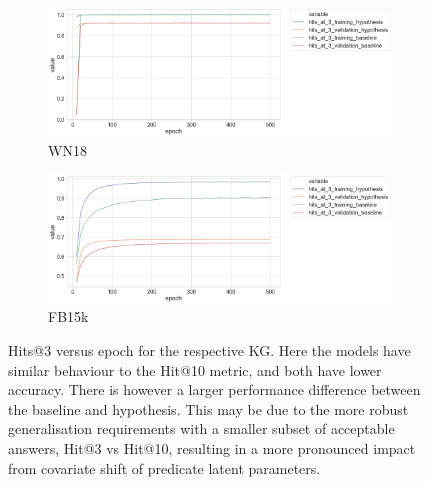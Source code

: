 
\begin{figure}[H]
	\begin{subfigure}[b]{.5\linewidth}
   		\centering
    		\includegraphics[width=1.0\linewidth, height=0.6\linewidth]{WN18_hits_at_3_Results}
		\captionsetup{justification=centering}
		\caption{WN18}
	\end{subfigure}
	\begin{subfigure}[b]{.5\linewidth}
   		\centering
		\includegraphics[width=1.0\linewidth, height=0.6\linewidth]{FB15k_hits_at_3_Results}
		\captionsetup{justification=centering}
		\caption{FB15k}
	\end{subfigure}
	\captionsetup{justification=centering}
	\caption{Hits@3 versus epoch for the respective KG. Here the models have similar behaviour to the Hit@10 metric, and both have lower accuracy. There is however a larger performance difference between the baseline and hypothesis. This may be due to the more robust generalisation requirements with a smaller subset of acceptable answers, Hit@3 vs Hit@10, resulting in a more pronounced impact from covariate shift of predicate latent parameters.}
\end{figure}

